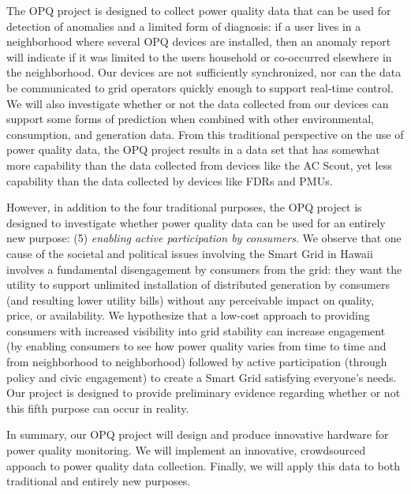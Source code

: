 The OPQ project is designed to collect power quality data that can be used for detection of anomalies and a limited form of diagnosis: if a user lives in a neighborhood where several OPQ devices are installed, then an anomaly report will indicate if it was limited to the users household or co-occurred elsewhere in the neighborhood. Our devices are not sufficiently synchronized, nor can the data be communicated to grid operators quickly enough to support real-time control. We will also investigate whether or not the data collected from our devices can support some forms of prediction when combined with other environmental, consumption, and generation data. From this traditional perspective on the use of power quality data, the OPQ project results in a data set that has somewhat more capability than the data collected from devices like the AC Scout, yet less capability than the data collected by devices like FDRs and PMUs. 

However, in addition to the four traditional purposes, the OPQ project is designed to investigate whether power quality data can be used for an entirely new purpose: (5) {\em enabling active participation by consumers}. We observe that one cause of the societal and political issues involving the Smart Grid in Hawaii involves a fundamental disengagement by consumers from the grid: they want the utility to support unlimited installation of distributed generation by consumers (and resulting lower utility bills) without any perceivable impact on quality, price, or availability.  We hypothesize that a low-cost approach to providing consumers with increased visibility into grid stability can increase engagement (by enabling consumers to see how power quality varies from time to time and from neighborhood to neighborhood) followed by active participation (through policy and civic engagement) to create a Smart Grid satisfying everyone's needs.  Our project is designed to provide preliminary evidence regarding whether or not this fifth purpose can occur in reality.

In summary, our OPQ project will design and produce innovative hardware for power quality monitoring. We will implement an innovative, crowdsourced appoach to power quality data collection. Finally, we will apply this data to both traditional and entirely new purposes.   